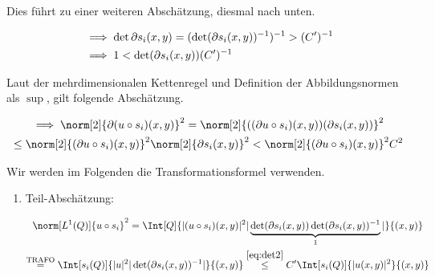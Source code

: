 \begin{solution}
\begin{enumerate}[label = \textbf{\alph*)}]
\begin{enumerate}[label = \arabic*.]
    Dies führt zu einer weiteren Abschätzung, diesmal nach unten.

    \begin{align}
      &
      \notag
      \implies
      \det \partial s_i(x, y)
      =
      (\det (\partial s_i(x, y))^{-1})^{-1}
      >
      (C^\prime)^{-1} \\
      &
      \label{eq:det3}
      \implies
      1
      <
      \det (\partial s_i(x, y))
      (C^\prime)^{-1}
    \end{align}

    Laut der mehrdimensionalen Kettenregel und Definition der Abbildungsnormen als $\sup$, gilt folgende Abschätzung.

    \begin{multline}
      \label{eq:Kettenregel-Ungleichung}
      \implies
      \norm[2]{\partial (u \circ s_i)(x, y)}^2
      =
      \norm[2]
      {
        (
          (\partial u \circ s_i)(x, y)
        )(
          \partial s_i(x, y)
        )}^2 \\
      \leq
      \norm[2]{(\partial u \circ s_i)(x, y)}^2
      \norm[2]{\partial s_i(x, y)}^2
      <
      \norm[2]{(\partial u \circ s_i)(x, y)}^2
      C^2
    \end{multline}

    Wir werden im Folgenden die Transformationsformel verwenden.


    \begin{enumerate}[label = \arabic*.]

      \item Teil-Abschätzung:
      
      \begin{multline}
        \label{eq:part1}
        \norm[L^1(Q)]{u \circ s_i}^2
        =
        \Int[Q]
        {
          |(u \circ s_i)(x, y)|^2
          |
            \underbrace
            {
              \det (\partial s_i(x, y))
              \det (\partial s_i(x, y))^{-1}
            }_1
          |
        }{(x, y)} \\
        \stackrel
        {
          \text{TRAFO}
        }{=}
        \Int[s_i(Q)]
        {
          |u|^2
          |\det (\partial s_i(x, y))^{-1}|
        }{(x, y)}
        \stackrel{\eqref{eq:det2}}{\leq}
        C^\prime
        \Int[s_i(Q)]{|u(x, y)|^2}{(x, y)}
      \end{multline}


\end{enumerate}
\end{enumerate}
\end{enumerate}
\end{solution}
